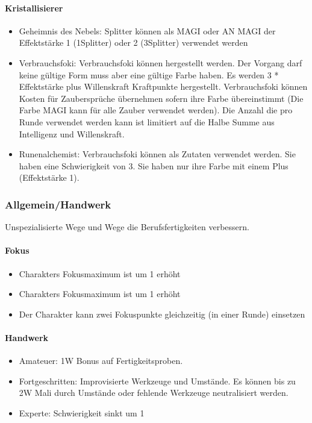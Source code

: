 \documentclass{article}
\begin{document}
\paragraph{Kristallisierer}

\begin{itemize}
\item Geheimnis des Nebels: Splitter können als MAGI oder AN MAGI der Effektstärke 1 (1Splitter) oder 2 (3Splitter) verwendet werden
\item Verbrauchsfoki: Verbrauchsfoki können hergestellt werden. Der Vorgang darf keine gültige Form muss aber eine gültige Farbe haben. Es werden 3 * Effektstärke plus Willenskraft Kraftpunkte hergestellt. Verbrauchsfoki können Kosten für Zaubersprüche übernehmen sofern ihre Farbe übereinstimmt (Die Farbe MAGI kann für alle Zauber verwendet werden). Die Anzahl die pro Runde verwendet werden kann ist limitiert auf die Halbe Summe aus Intelligenz und Willenskraft.
\item Runenalchemist: Verbrauchsfoki können als Zutaten verwendet werden. Sie haben eine Schwierigkeit von 3. Sie haben nur ihre Farbe mit einem Plus (Effektstärke 1).
\end{itemize}

\subsubsection{Allgemein/Handwerk}

Unspezialisierte Wege und Wege die Berufsfertigkeiten verbessern.

\paragraph{Fokus}

\begin{itemize}
\item Charakters Fokusmaximum ist um 1 erhöht
\item Charakters Fokusmaximum ist um 1 erhöht
\item Der Charakter kann zwei Fokuspunkte gleichzeitig (in einer Runde) einsetzen
\end{itemize}

\paragraph{Handwerk}

\begin{itemize}
\item Amateuer: 1W Bonus auf Fertigkeitsproben.
\item Fortgeschritten: Improvisierte Werkzeuge und Umstände. Es können bis zu 2W Mali durch Umstände oder fehlende Werkzeuge neutralisiert werden.
\item Experte: Schwierigkeit sinkt um 1
\end{itemize}
\end{document}
